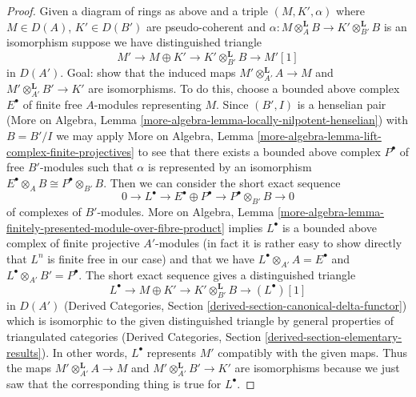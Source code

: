 \begin{proof}
\medskip\noindent
Given a diagram of rings as above and a triple
$(M, K', \alpha)$ where $M \in D(A)$, $K' \in D(B')$ are
pseudo-coherent and
$\alpha : M \otimes_A^\mathbf{L} B \to K' \otimes_{B'}^\mathbf{L} B$
is an isomorphism suppose we have distinguished triangle
$$
M' \to M \oplus K' \to K' \otimes_{B'}^\mathbf{L} B \to M'[1]
$$
in $D(A')$. Goal: show that the induced maps
$M' \otimes_{A'}^\mathbf{L} A \to M$ and
$M' \otimes_{A'}^\mathbf{L} B' \to K'$ are isomorphisms.
To do this, choose a bounded above complex
$E^\bullet$ of finite free $A$-modules representing $M$.
Since $(B', I)$ is a henselian pair
(More on Algebra, Lemma \ref{more-algebra-lemma-locally-nilpotent-henselian})
with $B = B'/I$ we may apply More on Algebra, Lemma
\ref{more-algebra-lemma-lift-complex-finite-projectives}
to see that there exists a bounded above complex $P^\bullet$
of free $B'$-modules such that $\alpha$ is represented
by an isomorphism $E^\bullet \otimes_A B \cong P^\bullet \otimes_{B'} B$.
Then we can consider the short exact sequence
$$
0 \to L^\bullet \to
E^\bullet \oplus P^\bullet \to P^\bullet \otimes_{B'} B \to 0
$$
of complexes of $B'$-modules.
More on Algebra, Lemma
\ref{more-algebra-lemma-finitely-presented-module-over-fibre-product}
implies $L^\bullet$ is a bounded above complex of
finite projective $A'$-modules
(in fact it is rather easy to show directly that $L^n$ is finite free
in our case) and that we have
$L^\bullet \otimes_{A'} A = E^\bullet$ and
$L^\bullet \otimes_{A'} B' = P^\bullet$.
The short exact sequence gives a distinguished triangle
$$
L^\bullet \to M \oplus K' \to K' \otimes_{B'}^\mathbf{L} B \to (L^\bullet)[1]
$$
in $D(A')$ (Derived Categories, Section
\ref{derived-section-canonical-delta-functor}) which is isomorphic
to the given distinguished triangle by general properties of
triangulated categories (Derived Categories, Section
\ref{derived-section-elementary-results}). In other words, $L^\bullet$
represents $M'$ compatibly with the given maps. Thus the maps
$M' \otimes_{A'}^\mathbf{L} A \to M$ and
$M' \otimes_{A'}^\mathbf{L} B' \to K'$ are
isomorphisms because we just saw that the corresponding
thing is true for $L^\bullet$.
\end{proof}